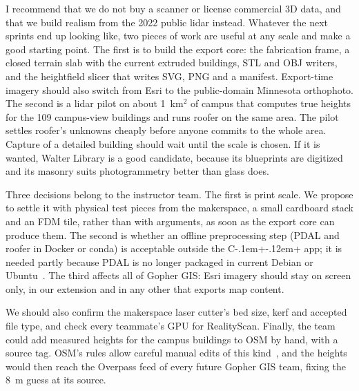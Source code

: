 \documentclass[11pt,letterpaper]{article}
\newcommand{\cpp}{C\kern-.1em+\kern-.12em+}
\begin{document}
I recommend that we do not buy a scanner or license commercial 3D data, and that we build realism from the 2022 public lidar instead. Whatever the next sprints end up looking like, two pieces of work are useful at any scale and make a good starting point. The first is to build the export core: the fabrication frame, a closed terrain slab with the current extruded buildings, STL and OBJ writers, and the heightfield slicer that writes SVG, PNG and a manifest. Export-time imagery should also switch from Esri to the public-domain Minnesota orthophoto. The second is a lidar pilot on about 1~km$^2$ of campus that computes true heights for the 109 campus-view buildings and runs roofer on the same area. The pilot settles roofer's unknowns cheaply before anyone commits to the whole area. Capture of a detailed building should wait until the scale is chosen. If it is wanted, Walter Library is a good candidate, because its blueprints are digitized and its masonry suits photogrammetry better than glass does.

Three decisions belong to the instructor team. The first is print scale. We propose to settle it with physical test pieces from the makerspace, a small cardboard stack and an FDM tile, rather than with arguments, as soon as the export core can produce them. The second is whether an offline preprocessing step (PDAL and roofer in Docker or conda) is acceptable outside the \cpp{} app; it is needed partly because PDAL is no longer packaged in current Debian or Ubuntu~\cite{repologypdal}. The third affects all of Gopher GIS: Esri imagery should stay on screen only, in our extension and in any other that exports map content.

We should also confirm the makerspace laser cutter's bed size, kerf and accepted file type, and check every teammate's GPU for RealityScan. Finally, the team could add measured heights for the campus buildings to OSM by hand, with a source tag. OSM's rules allow careful manual edits of this kind~\cite{osmimport}, and the heights would then reach the Overpass feed of every future Gopher GIS team, fixing the 8~m guess at its source.
\end{document}
